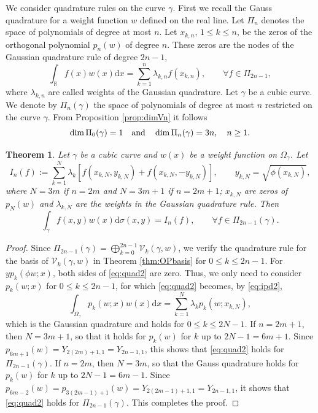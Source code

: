 \documentclass{amsart}
\newtheorem{thm}{Theorem}[section]
\theoremstyle{remark}
\def\d{\mathrm{d}}
\def\g{{\gamma}}
\def\l{{\lambda}}
\def\s{\sigma}
\def\CV{{\mathcal V}}
\def\RR{{\mathbb R}}
\begin{document}
We consider quadrature rules on the curve $\g$. First we recall the Gauss quadrature for a weight function 
$w$ defined on the real line. Let $\Pi_n$ denotes the space of polynomials of degree at most $n$. 
Let $x_{k,n}$, $1\le k \le n$, be the zeros of the orthogonal polynomial $p_n(w)$ of degree $n$. 
These zeros are the nodes of the Gaussian quadrature rule of degree $2n-1$, 
$$
  \int_\RR f(x) w(x) \d x = \sum_{k=1}^n \lambda_{k,n} f(x_{k,n}), \qquad \forall f\in \Pi_{2n-1},
$$ 
where $\l_{k,n}$ are called weights of the Gaussian quadrature. Let $\g$ be a cubic curve. We
denote by $\Pi_n(\g)$ the space of polynomials of degree at most $n$ restricted on the curve $\g$. From
Proposition \ref{prop:dimVn} it follows 
$$
   \dim \Pi_0(\g) =1 \quad\hbox{and}\quad  \dim \Pi_n(\g) = 3 n, \quad n \ge 1.
$$

\begin{thm}
Let $\g$ be a cubic curve and $w(x)$ be a weight function on $\Omega_\g$. Let  
\begin{equation}\label{eq:quad1}
   I_n (f):=  \sum_{k=1}^{N} \l_k \left[f(x_{k,N},y_{k,N})+f(x_{k,N},-y_{k,N})\right], \qquad y_{k,N} = \sqrt{\phi(x_{k,N})}, 
\end{equation}
where $N =3m$ if $n = 2m$ and $N =3m+1$ if $n=2m+1$; $x_{k,N}$ are zeros of $p_N(w)$ and $\l_{k,N}$ are the 
weights in the Gaussian quadrature rule. Then
\begin{equation}\label{eq:quad2}
  \int_\g f(x,y) w(x) \d \s(x,y) = I_n(f), \qquad \forall f\in \Pi_{2n-1}(\g). 
\end{equation}
\end{thm}

\begin{proof}
Since $\Pi_{2n-1}(\g) = \bigoplus_{k=0}^{2n-1} \CV_k(\g,w)$, we verify the quadrature rule for the basis of 
$\CV_k(\g,w)$ in Theorem \ref{thm:OPbasis} for $0 \le k \le 2n-1$. For $y p_k(\phi w;x)$, both sides of 
\eqref{eq:quad2} are zero. Thus, we only need to consider $p_k(w; x)$ for $0 \le k \le 2n-1$, for which
\eqref{eq:quad2} becomes, by \eqref{eq:ipd2},
$$
  \int_{\Omega_\g} p_k(w;x) w(x) \d x =  \sum_{k=1}^{N} \l_k p_k(w; x_{k,N}),
$$
which is the Gaussian quadrature and holds for $0 \le k \le 2 N-1$. If $n=2m+1$, then $N = 3m+1$, so that 
it holds for $p_k(w)$ for $k$ up to $2N-1 = 6m+1$. Since $p_{6m+1}(w) = Y_{2(2m)+1, 1} = Y_{2n-1,1}$, this
shows that \eqref{eq:quad2} holds for $\Pi_{2n-1}(\g)$. If $n =2m$, then $N =3m$, so that the Gauss quadrature  
holds for $p_k(w)$ for $k$ up to $2N-1 = 6m-1$. Since $p_{6m-2}(w) = p_{3(2m-1)+1}(w) = Y_{2(2m-1)+1,1}
 = Y_{2n-1,1}$, it shows that \eqref{eq:quad2} holds for $\Pi_{2n-1}(\g)$. This completes the proof.
\end{proof}
 
\end{document}
